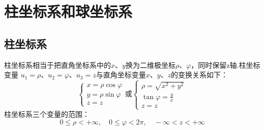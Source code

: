 \documentclass[12pt, UTF8, AutoFakeBold]{ctexart} %
\begin{document}
\tableofcontents %
\clearpage

\section{柱坐标系和球坐标系}

\subsection{柱坐标系}
柱坐标系相当于把直角坐标系中的$x$、$y$换为二维极坐标$\rho$、$\varphi$，同时保留z轴.柱坐标变量
$u_1 = \rho$、$u_2 = \varphi$、$u_3 = z$与直角坐标变量$x$、$y$、$z$的变换关系如下：
\[
    \begin{cases}
        x = \rho \cos\varphi\\
        y = \rho \sin\varphi\\
        z = z
    \end{cases}
    \text{或}
    \begin{cases}
        \rho = \sqrt{x^2 + y^2}\\
        \tan\varphi =  \frac{y}{x}\\
        z = z
    \end{cases}
\]
柱坐标系三个变量的范围：
\[
    0 \leq \rho < +\infty, \quad
    0 \leq \varphi < 2\pi, \quad
    -\infty < z < +\infty
\]

\begin{figure}[htbp]
    \centering
    \qquad
\end{figure}
\end{document}
